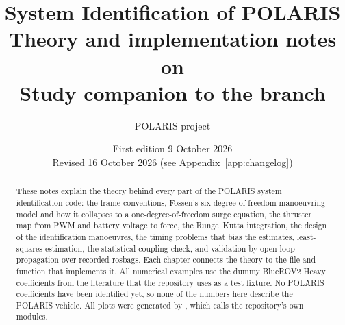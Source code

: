 \documentclass[11pt,a4paper]{report}
\title{\textbf{System Identification of POLARIS}\\[4pt]
  \large Theory and implementation notes on \file{scripts/sysid}\\[2pt]
  \normalsize Study companion to the \file{feature/sysid} branch}
\author{POLARIS project}
\date{First edition 9 October 2026\\ Revised 16 October 2026 (see Appendix~\ref{app:changelog})}
\newcommand{\file}[1]{\texttt{\detokenize{#1}}}
\begin{document}
\maketitle

\begin{abstract}
\noindent
These notes explain the theory behind every part of the POLARIS system identification
code: the frame conventions, Fossen's six-degree-of-freedom manoeuvring model and how
it collapses to a one-degree-of-freedom surge equation, the thruster map from PWM and
battery voltage to force, the Runge--Kutta integration, the design of the identification
manoeuvres, the timing problems that bias the estimates, least-squares estimation, the
statistical coupling check, and validation by open-loop propagation over recorded
rosbags. Each chapter connects the theory to the file and function that implements it.
All numerical examples use the dummy BlueROV2 Heavy coefficients from the literature
that the repository uses as a test fixture. No POLARIS coefficients have been identified
yet, so none of the numbers here describe the POLARIS vehicle. All plots were generated
by \file{gen_figdata.py}, which calls the repository's own modules.
\end{abstract}

\tableofcontents




















\appendix






\end{document}
